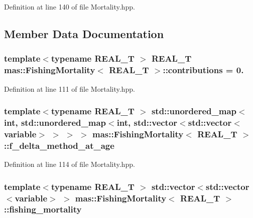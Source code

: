 Definition at line 140 of file Mortality.\-hpp.



\subsection{Member Data Documentation}
\hypertarget{structmas_1_1_fishing_mortality_ac9621f8a36e68bd04ff91a0896c4b09d}{
\subsubsection[{contributions}]{\setlength{\rightskip}{0pt plus 5cm}template$<$typename R\-E\-A\-L\-\_\-\-T $>$ R\-E\-A\-L\-\_\-\-T {\bf mas\-::\-Fishing\-Mortality}$<$ R\-E\-A\-L\-\_\-\-T $>$\-::contributions = 0.}}\label{structmas_1_1_fishing_mortality_ac9621f8a36e68bd04ff91a0896c4b09d}


Definition at line 111 of file Mortality.\-hpp.

\hypertarget{structmas_1_1_fishing_mortality_ad92f2a24fd5a5f26a00ad98a9276af27}{
\subsubsection[{f\-\_\-delta\-\_\-method\-\_\-at\-\_\-age}]{\setlength{\rightskip}{0pt plus 5cm}template$<$typename R\-E\-A\-L\-\_\-\-T $>$ std\-::unordered\-\_\-map$<$int, std\-::unordered\-\_\-map$<$int, std\-::vector$<$std\-::vector$<${\bf variable}$>$ $>$ $>$ $>$ {\bf mas\-::\-Fishing\-Mortality}$<$ R\-E\-A\-L\-\_\-\-T $>$\-::f\-\_\-delta\-\_\-method\-\_\-at\-\_\-age}}\label{structmas_1_1_fishing_mortality_ad92f2a24fd5a5f26a00ad98a9276af27}


Definition at line 114 of file Mortality.\-hpp.

\hypertarget{structmas_1_1_fishing_mortality_a8762786de78be37776c371f1a4f46fcc}{
\subsubsection[{fishing\-\_\-mortality}]{\setlength{\rightskip}{0pt plus 5cm}template$<$typename R\-E\-A\-L\-\_\-\-T $>$ std\-::vector$<$std\-::vector$<${\bf variable}$>$ $>$ {\bf mas\-::\-Fishing\-Mortality}$<$ R\-E\-A\-L\-\_\-\-T $>$\-::fishing\-\_\-mortality}}\label{structmas_1_1_fishing_mortality_a8762786de78be37776c371f1a4f46fcc}


